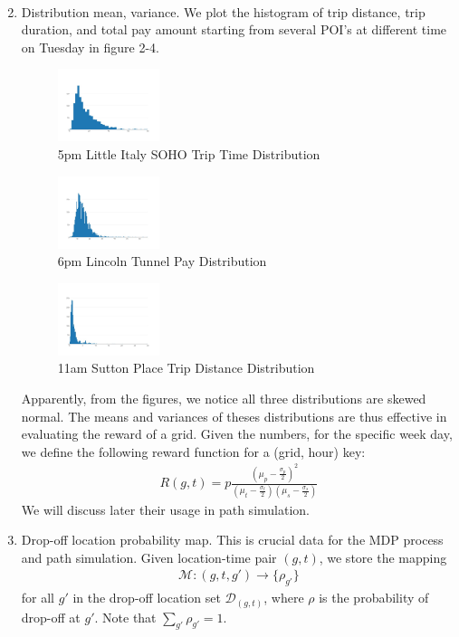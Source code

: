 \documentclass[letterpaper, 10 pt, conference]{ieeeconf}
\begin{document}
\begin{enumerate}
\begin{align}
\end{align}
\item Distribution mean, variance. We plot the histogram of trip distance, trip duration, and total pay amount starting from several POI's at different time on Tuesday in figure 2-4.
\begin{figure}
\centering
\includegraphics[width=0.28\textwidth]{5pm-littleitaly-soho-triptime.jpeg}
\caption{5pm Little Italy SOHO Trip Time Distribution}
\end{figure}
\begin{figure}
\centering
\includegraphics[width=0.28\textwidth]{18-lincoln-tunnel-pay.jpeg}
\caption{6pm Lincoln Tunnel Pay Distribution}
\end{figure}
\begin{figure}
\centering
\includegraphics[width=0.28\textwidth]{11am-sutton-place-dist.jpeg}
\caption{11am Sutton Place Trip Distance Distribution}
\end{figure}
Apparently, from the figures, we notice all three distributions are skewed normal. The means and variances of theses distributions are thus effective in evaluating the reward of a grid. Given the numbers, for the specific week day, we define the following reward function for a (grid, hour) key:
\begin{align}
R(g, t) = p\frac{(\mu_p-\frac{\sigma_p}{2})^2}{(\mu_t-\frac{\sigma_t}{2})(\mu_s-\frac{\sigma_s}{2})}
\end{align}
We will discuss later their usage in path simulation. 
\item Drop-off location probability map. This is crucial data for the MDP process and path simulation. Given location-time pair $(g, t)$, we store the mapping 
\begin{align}
\mathcal{M}:(g,t,g')\to \{\rho_{g'}\}
\end{align}
for all $g'$ in the drop-off location set $\mathcal{D}_{(g,t)}$, where $\rho$ is the probability of drop-off at $g'$. Note that $\sum_{g'}\rho_{g'}=1$.
\end{enumerate}
\end{document}
